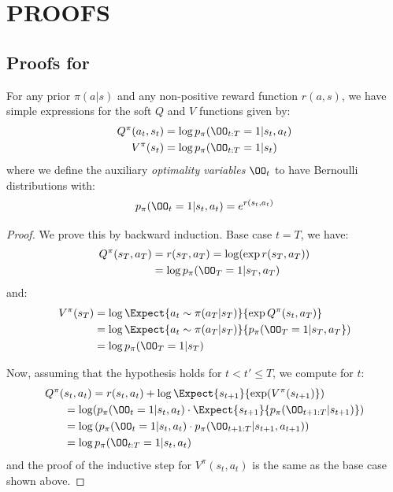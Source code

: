 \section{PROOFS}\label{appendix:proofs}

\subsection{Proofs for~}

\begin{proposition}
    For any prior $\pi(a|s)$ and any non-positive reward function $r(a,s)$, we have simple expressions for the soft $Q$ and $V$ functions given by:
    \begin{align*}
        Q^\pi(a_t, s_t) &= \log p_\pi(\OO_{t:T} = 1|s_t,a_t) \\
        V^\pi(s_t) &= \log p_\pi(\OO_{t:T} = 1|s_t)
    \end{align*}
    where we define the auxiliary \emph{optimality variables} $\OO_t$ to have Bernoulli distributions with:
    \[
    p_\pi(\OO_t = 1|s_t,a_t) = e^{r(s_t,a_t)}
    \]
\end{proposition}
\begin{proof}
    We prove this by backward induction. Base case $t = T$, we have:
    \begin{align*}
    Q^\pi(s_T, a_T) &= r(s_T, a_T) = \log (\exp r(s_T, a_T)) \\
    &= \log p_\pi(\OO_{T} = 1|s_T,a_T)
    \end{align*}
    and:
    \begin{align*}
    V^\pi(s_T) &= \log \Expect{a_t \sim \pi(a_T|s_T)}{\exp Q^\pi(s_t, a_T)} \\
    &= \log \Expect{a_t \sim \pi(a_T|s_T)}{p_\pi(\OO_{T} =1|s_T, a_T})\\
    &= \log p_\pi(\OO_{T}=1|s_T)
    \end{align*}
    
    Now, assuming that the hypothesis holds for $t < t' \leq T$, we compute for $t$:
    \begin{align*}
        Q^\pi(&s_{t},a_{t}) = r(s_{t}, a_{t}) + \log \Expect{s_{t+1}}{\exp(V^\pi(s_{t+1})}) \\
        &= \log (p_\pi(\OO_{t} = 1|s_{t},a_{t}) \cdot \Expect{s_{t+1}}{p_\pi(\OO_{t+1:T}|s_{t+1})}) \\
        &= \log \left(p_\pi(\OO_{t} = 1|s_{t},a_{t})  \cdot p_\pi(\OO_{t+1:T}|s_{t+1}, a_{t+1})\right) \\
        &= \log p_\pi(\OO_{t:T} = 1|s_{t},a_{t})
    \end{align*}
    and the proof of the inductive step for $V^\pi(s_t, a_t)$ is the same as the base case shown above.
\end{proof}


